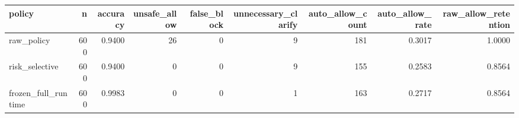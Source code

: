 \begin{tabular}{lrrrrrrrr}
\toprule
policy & n & accuracy & unsafe_allow & false_block & unnecessary_clarify & auto_allow_count & auto_allow_rate & raw_allow_retention \\
\midrule
raw_policy & 600 & 0.9400 & 26 & 0 & 9 & 181 & 0.3017 & 1.0000 \\
risk_selective & 600 & 0.9400 & 0 & 0 & 9 & 155 & 0.2583 & 0.8564 \\
frozen_full_runtime & 600 & 0.9983 & 0 & 0 & 1 & 163 & 0.2717 & 0.8564 \\
\bottomrule
\end{tabular}
